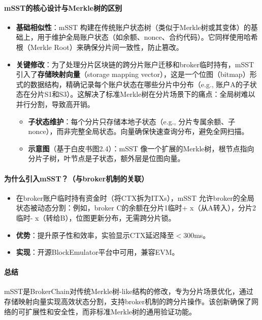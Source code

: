 \documentclass[a4paper,12pt]{ctexart}
\begin{document}
\paragraph{mSST的核心设计与Merkle树的区别}
\begin{itemize}
  \item \textbf{基础相似性}：mSST 构建在传统账户状态树（类似于Merkle树或其变体）的基础上，用于维护全局账户状态（如余额、nonce、合约代码）。它同样使用哈希根（Merkle Root）来确保分片间一致性，防止篡改。
  \item \textbf{关键修改}：为了处理分片区块链的跨分片账户迁移和broker临时持有，mSST 引入了\textbf{存储映射向量}（storage mapping vector），这是一个位图（bitmap）形式的数据结构，精确记录每个账户状态在哪些分片中分布（e.g., 账户A的子状态在分片S1和S3）。这解决了标准Merkle树在分片场景下的痛点：全局树难以并行分割，导致高开销。
    \begin{itemize}
      \item \textbf{子状态维护}：每个分片只存储本地子状态（e.g., 分片专属余额、子nonce），而非完整全局状态。向量确保快速查询分布，避免全网扫描。
      \item \textbf{示意图}（基于白皮书图2.4）：mSST 像一个扩展的Merkle树，根节点指向分片子树，叶节点是子状态，额外层是位图向量。
    \end{itemize}
\end{itemize}

\paragraph{为什么引入mSST？（与broker机制的关联）}
\begin{itemize}
  \item 在broker账户临时持有资金时（将CTX拆为ITXs），mSST 允许broker的全局状态被动态分割：例如，broker C的余额在分片1临时+ x（从A转入），分片2临时- x（转给B），位图更新分布，无需跨分片锁。
  \item \textbf{优势}：提升原子性和效率，实验显示CTX延迟降至$<$300ms。
  \item \textbf{实现}：开源BlockEmulator平台中可用，兼容EVM。
\end{itemize}

\paragraph*{总结}
mSST是BrokerChain对传统Merkle树-like结构的修改，专为分片场景优化，通过存储映射向量实现高效状态分割，支持broker机制的跨分片操作。该创新确保了网络的可扩展性和安全性，而非标准Merkle树的通用验证功能。
\end{document}

